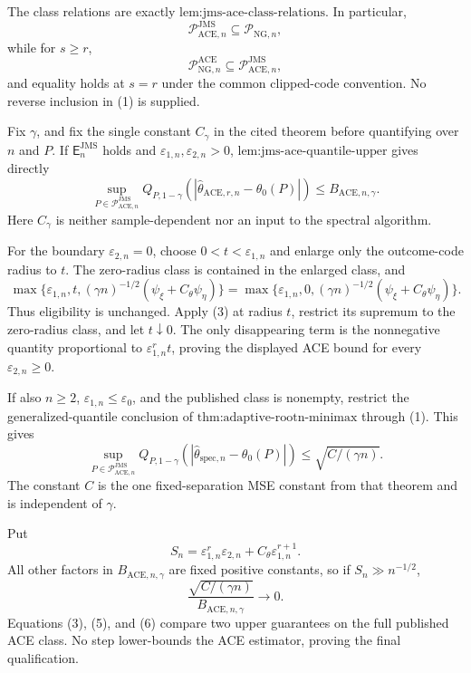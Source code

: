 The class relations are exactly \(\text{lem:jms-ace-class-relations}\).  In particular,
\[
 \mathcal P_{\mathrm{ACE},n}^{\mathrm{JMS}}
 \subseteq\mathcal P_{\mathrm{NG},n}, \tag{1}
\]
while for \(s\ge r\),
\[
 \mathcal P_{\mathrm{NG},n}^{\mathrm{ACE}}
 \subseteq\mathcal P_{\mathrm{ACE},n}^{\mathrm{JMS}}, \tag{2}
\]
and equality holds at \(s=r\) under the common clipped-code convention.  No reverse inclusion in (1) is supplied.

Fix \(\gamma\), and fix the single constant \(C_{\gamma}\) in the cited theorem before quantifying over \(n\) and \(P\).  If \(\mathsf E_n^{\mathrm{JMS}}\) holds and \(\varepsilon_{1,n},\varepsilon_{2,n}>0\), \(\text{lem:jms-ace-quantile-upper}\) gives directly
\[
 \sup_{P\in\mathcal P_{\mathrm{ACE},n}^{\mathrm{JMS}}}
 Q_{P,1-\gamma}
 (|\widehat\theta_{\mathrm{ACE},r,n}-\theta_0(P)|)
 \le B_{\mathrm{ACE},n,\gamma}. \tag{3}
\]
Here \(C_{\gamma}\) is neither sample-dependent nor an input to the spectral algorithm.

For the boundary \(\varepsilon_{2,n}=0\), choose \(0<t<\varepsilon_{1,n}\) and enlarge only the outcome-code radius to \(t\).  The zero-radius class is contained in the enlarged class, and
\[
 \max\{\varepsilon_{1,n},t,
 (\gamma n)^{-1/2}(\psi_{\xi}+C_{\theta}\psi_{\eta})\}
 =
 \max\{\varepsilon_{1,n},0,
 (\gamma n)^{-1/2}(\psi_{\xi}+C_{\theta}\psi_{\eta})\}. \tag{4}
\]
Thus eligibility is unchanged.  Apply (3) at radius \(t\), restrict its supremum to the zero-radius class, and let \(t\downarrow0\).  The only disappearing term is the nonnegative quantity proportional to \(\varepsilon_{1,n}^rt\), proving the displayed ACE bound for every \(\varepsilon_{2,n}\ge0\).

If also \(n\ge2\), \(\varepsilon_{1,n}\le\varepsilon_0\), and the published class is nonempty, restrict the generalized-quantile conclusion of \(\text{thm:adaptive-rootn-minimax}\) through (1).  This gives
\[
 \sup_{P\in\mathcal P_{\mathrm{ACE},n}^{\mathrm{JMS}}}
 Q_{P,1-\gamma}
 (|\widehat\theta_{\mathrm{spec},n}-\theta_0(P)|)
 \le\sqrt{C/(\gamma n)}. \tag{5}
\]
The constant \(C\) is the one fixed-separation MSE constant from that theorem and is independent of \(\gamma\).

Put
\[
 S_n=\varepsilon_{1,n}^r\varepsilon_{2,n}
 +C_{\theta}\varepsilon_{1,n}^{r+1}.
\]
All other factors in \(B_{\mathrm{ACE},n,\gamma}\) are fixed positive constants, so if \(S_n\gg n^{-1/2}\),
\[
 \frac{\sqrt{C/(\gamma n)}}{B_{\mathrm{ACE},n,\gamma}}
 \longrightarrow0. \tag{6}
\]
Equations (3), (5), and (6) compare two upper guarantees on the full published ACE class.  No step lower-bounds the ACE estimator, proving the final qualification.